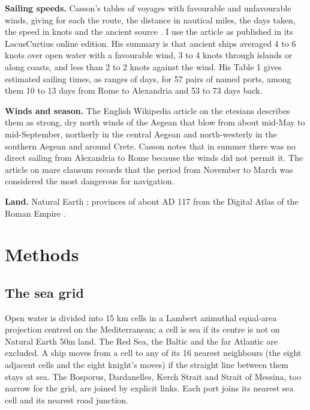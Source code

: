 \documentclass[11pt,a4paper]{article}
\begin{document}
\textbf{Sailing speeds.} Casson's tables of voyages with favourable and unfavourable winds, giving for each the route, the distance in nautical miles, the days taken, the speed in knots and the ancient source \citep{casson1951}. I use the article as published in its LacusCurtius online edition. His summary is that ancient ships averaged 4 to 6 knots over open water with a favourable wind, 3 to 4 knots through islands or along coasts, and less than 2 to 2\textonehalf{} knots against the wind. His Table 1 gives estimated sailing times, as ranges of days, for 57 pairs of named ports, among them 10 to 13 days from Rome to Alexandria and 53 to 73 days back.

\textbf{Winds and season.} The English Wikipedia article on the etesians \citep{wikietesian} describes them as strong, dry north winds of the Aegean that blow from about mid-May to mid-September, northerly in the central Aegean and north-westerly in the southern Aegean and around Crete. Casson notes that in summer there was no direct sailing from Alexandria to Rome because the winds did not permit it. The article on mare clausum \citep{wikimare} records that the period from November to March was considered the most dangerous for navigation.

\textbf{Land.} Natural Earth \citep{naturalearth}; provinces of about AD 117 from the Digital Atlas of the Roman Empire \citep{dare}.

\section{Methods}
\subsection{The sea grid}
Open water is divided into 15 km cells in a Lambert azimuthal equal-area projection centred on the Mediterranean; a cell is sea if its centre is not on Natural Earth 50m land. The Red Sea, the Baltic and the far Atlantic are excluded. A ship moves from a cell to any of its 16 nearest neighbours (the eight adjacent cells and the eight knight's moves) if the straight line between them stays at sea. The Bosporus, Dardanelles, Kerch Strait and Strait of Messina, too narrow for the grid, are joined by explicit links. Each port joins its nearest sea cell and its nearest road junction.
\end{document}
